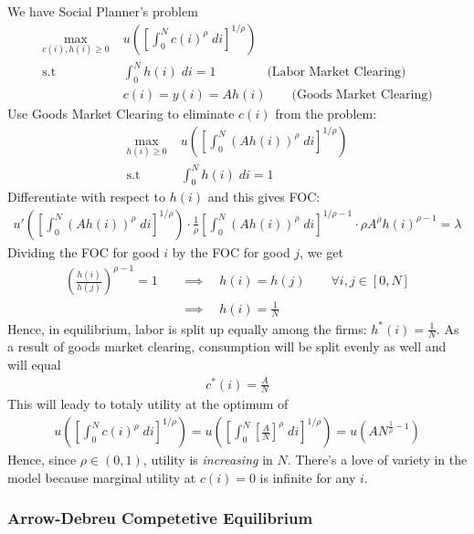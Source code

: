 \documentclass[12pt]{article}
\theoremstyle{plain}
\theoremstyle{definition}
\theoremstyle{remark}
\newcommand{\intzN}{\int_0^N}
\begin{document}
We have Social Planner's problem
\begin{align*}
  \max_{c(i), h(i)\geq 0}
    & \; u\left(
      \left[ \int_0^N c(i)^\rho \; di \right]^{1/\rho}
    \right)\\
  \text{s.t} & \;
  \intzN h(i) \; di = 1
  \qquad\qquad
  \text{(Labor Market Clearing)} \\
  &\; c(i) = y(i) = Ah(i)
  \qquad
  \text{(Goods Market Clearing)}
\end{align*}
Use Goods Market Clearing to eliminate $c(i)$ from the problem:
\begin{align*}
  \max_{h(i)\geq 0}
    & \; u\left(
    \left[ \int_0^N (Ah(i))^\rho \; di \right]^{1/\rho}
    \right)\\
  \text{s.t} & \;
  \intzN h(i) \; di = 1
\end{align*}
Differentiate with respect to $h(i)$ and this gives FOC:
\begin{align*}
  u'\left( \left[ \int_0^N (Ah(i))^\rho \; di \right]^{1/\rho} \right)
  \cdot
  \frac{1}{\rho}\left[ \int_0^N (Ah(i))^\rho \; di \right]^{1/\rho-1}
  \cdot
  \rho A^\rho h(i)^{\rho-1}
  = \lambda
\end{align*}
Dividing the FOC for good $i$ by the FOC for good $j$, we get
\begin{align*}
  \left(
  \frac{h(i)}{h(j)}
  \right)^{\rho-1}
  = 1
  \quad&\implies\quad
  h(i) = h(j)
  \qquad \forall i,j \in[0,N] \\
  &\implies\quad
  h(i) = \frac{1}{N}
\end{align*}
Hence, in equilibrium, labor is split up equally among the firms:
$h^*(i)=\frac{1}{N}$. As a result of goods market clearing, consumption
will be split evenly as well and will equal
\begin{align*}
  c^*(i) = \frac{A}{N}
\end{align*}
This will leady to totaly utility at the optimum of
\begin{align*}
  u\left( \left[ \int_0^N c(i)^\rho \; di \right]^{1/\rho} \right)
  =
  u\left( \left[ \int_0^N
      \left[ \frac{A}{N} \right]^\rho \; di
    \right]^{1/\rho} \right)
  =
  u\left( A N^{\frac{1}{\rho}-1}\right)
\end{align*}
Hence, since $\rho\in(0,1)$, utility is \emph{increasing} in $N$.
There's a love of variety in the model
because marginal utility at $c(i)=0$ is infinite for any $i$.

\clearpage
\subsubsection{Arrow-Debreu Competetive Equilibrium}
\end{document}
